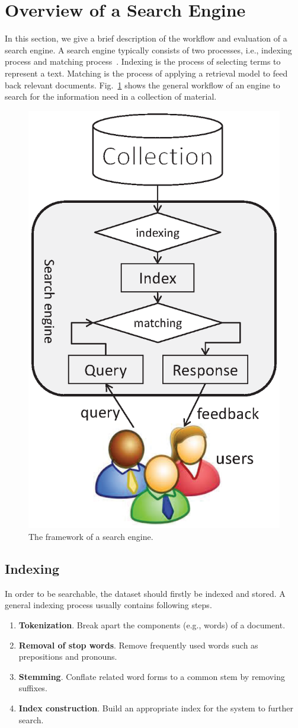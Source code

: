 \section{Overview of a Search Engine}\label{sec:overview}

In this section, we give a brief description of the workflow and evaluation of a search engine.
A search engine typically consists of two processes, i.e., indexing process and matching process~\cite{V99}.
Indexing is the process of selecting terms to represent a text.
Matching is the process of applying a retrieval model to feed back relevant documents.
Fig.~\ref{fig:frame} shows the general workflow of an engine to search for the information need in a collection of material.
\begin{figure}
  \centering
  \includegraphics[width=.5\columnwidth]{frame1}
  \caption{The framework of a search engine.}\label{fig:frame}
\end{figure}

\subsection{Indexing}

In order to be searchable, the dataset should firstly be indexed and stored.
A general indexing process usually contains following steps.
\begin{enumerate}
  \item \textbf{Tokenization}. Break apart the components (e.g., words) of a document.
  \item \textbf{Removal of stop words}. Remove frequently used words such as prepositions and pronouns.
  \item \textbf{Stemming}. Conflate related word forms to a common stem by removing suffixes.
  \item \textbf{Index construction}. Build an appropriate index for the system to further search.
\end{enumerate}

